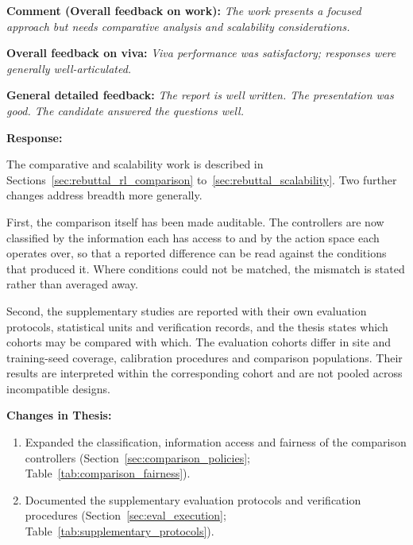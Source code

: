 \noindent\textbf{Comment (Overall feedback on work):} \textit{The work presents a
focused approach but needs comparative analysis and scalability
considerations.}

\noindent\textbf{Overall feedback on viva:} \textit{Viva performance was
satisfactory; responses were generally well-articulated.}

\noindent\textbf{General detailed feedback:} \textit{The report is well
written. The presentation was good. The candidate answered the questions
well.}

\vspace{\baselineskip}

\noindent\textbf{Response:}

The comparative and scalability work is described in
Sections~\ref{sec:rebuttal_rl_comparison} to~\ref{sec:rebuttal_scalability}.
Two further changes address breadth more generally.

First, the comparison itself has been made auditable. The controllers are now
classified by the information each has access to and by the action space each
operates over, so that a reported difference can be read against the conditions
that produced it. Where conditions could not be matched, the mismatch is stated
rather than averaged away.

Second, the supplementary studies are reported with their own evaluation
protocols, statistical units and verification records, and the thesis states
which cohorts may be compared with which. The evaluation cohorts differ in site and training-seed coverage,
calibration procedures and comparison populations. Their results are
interpreted within the corresponding cohort and are not pooled across
incompatible designs.

\vspace{\baselineskip}

\noindent\textbf{Changes in Thesis:}
\begin{enumerate}
  \item Expanded the classification, information access and fairness of the
        comparison controllers (Section~\ref{sec:comparison_policies};
        Table~\ref{tab:comparison_fairness}).
  \item Documented the supplementary evaluation protocols and verification
        procedures (Section~\ref{sec:eval_execution};
        Table~\ref{tab:supplementary_protocols}).
\end{enumerate}


\section{}
\label{sec:rebuttal_highlighting}

